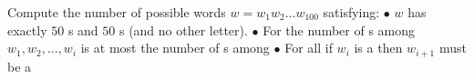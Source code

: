 Compute the number of possible words $w=w_1w_2\dots w_{100}$ satisfying:
$\bullet$ $w$ has exactly $50$ s and $50$ s (and no other letter).
$\bullet$ For  the number of s among $w_1, w_2, \dots, w_i$ is at most the number of s among 
$\bullet$ For all  if $w_i$ is a  then $w_{i+1}$ must be a 